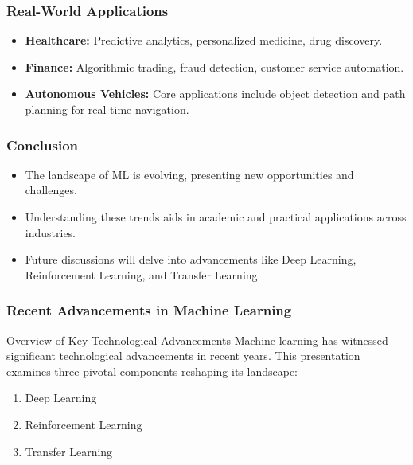 \documentclass{beamer}
\begin{document}
\begin{frame}[fragile]
    \frametitle{Real-World Applications}
    \begin{itemize}
        \item \textbf{Healthcare:} Predictive analytics, personalized medicine, drug discovery.
        \item \textbf{Finance:} Algorithmic trading, fraud detection, customer service automation.
        \item \textbf{Autonomous Vehicles:} Core applications include object detection and path planning for real-time navigation.
    \end{itemize}
\end{frame}

\begin{frame}[fragile]
    \frametitle{Conclusion}
    \begin{itemize}
        \item The landscape of ML is evolving, presenting new opportunities and challenges.
        \item Understanding these trends aids in academic and practical applications across industries.
        \item Future discussions will delve into advancements like Deep Learning, Reinforcement Learning, and Transfer Learning.
    \end{itemize}
\end{frame}

\begin{frame}[fragile]
    \frametitle{Recent Advancements in Machine Learning}
    \begin{block}{Overview of Key Technological Advancements}
        Machine learning has witnessed significant technological advancements in recent years. This presentation examines three pivotal components reshaping its landscape:
        \begin{enumerate}
            \item Deep Learning
            \item Reinforcement Learning
            \item Transfer Learning
        \end{enumerate}
    \end{block}
\end{frame}
\end{document}
